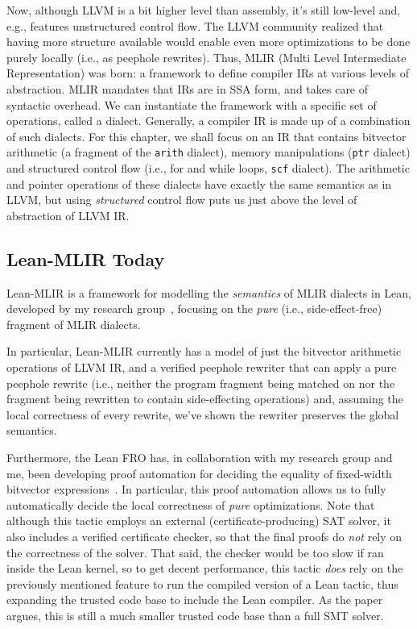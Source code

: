 \documentclass[a4paper]{scrartcl}
\begin{document}
Now, although LLVM is a bit higher level than assembly, it's still
low-level and, e.g., features unstructured control flow. The LLVM
community realized that having more structure available would enable
even more optimizations to be done purely locally (i.e., as peephole
rewrites). Thus, MLIR (Multi Level Intermediate Representation) was
born: a framework to define compiler IRs at various levels of
abstraction. MLIR mandates that IRs are in SSA form, and takes care of
syntactic overhead. We can instantiate the framework with a specific set
of operations, called a dialect. Generally, a compiler IR is made up of
a combination of such dialects. For this chapter, we shall focus on an
IR that contains bitvector arithmetic (a fragment of the \texttt{arith}
dialect), memory manipulations (\texttt{ptr} dialect) and structured
control flow (i.e., for and while loops, \texttt{scf} dialect). 
The arithmetic and pointer operations of these dialects have exactly the same semantics as in LLVM, 
but using \emph{structured} control flow puts us just above the level of abstraction of LLVM IR.

\subsection{Lean-MLIR Today}\label{Lean-MLIR-today}

Lean-MLIR is a framework for modelling the \emph{semantics} of MLIR
dialects in Lean, developed by my research group~\cite{bhatVerifyingPeepholeRewriting2024}, focusing on the
\emph{pure} (i.e., side-effect-free) fragment of MLIR dialects.

In particular, Lean-MLIR currently has a model of just the bitvector
arithmetic operations of LLVM IR, and a verified peephole rewriter that
can apply a pure peephole rewrite (i.e., neither the program fragment
being matched on nor the fragment being rewritten to contain
side-effecting operations) and, assuming the local correctness of every
rewrite, we've shown the rewriter preserves the global semantics.

Furthermore, the Lean FRO has, in collaboration with my research group
and me, been developing proof automation for deciding the equality
of fixed-width bitvector expressions~\cite{bovingTamingBitvectorBestiary}. In
particular, this proof automation allows us to fully automatically
decide the local correctness of \emph{pure} optimizations. Note that
although this tactic employs an external (certificate-producing) SAT
solver, it also includes a verified certificate checker, so that the
final proofs do \emph{not} rely on the correctness of the solver. That
said, the checker would be too slow if ran inside the Lean kernel, so to
get decent performance, this tactic \emph{does} rely on the previously
mentioned feature to run the compiled version of a Lean tactic, thus expanding
the trusted code base to include the Lean compiler.
As the paper argues, this is still a much smaller trusted code base than a full
SMT solver.
\end{document}
